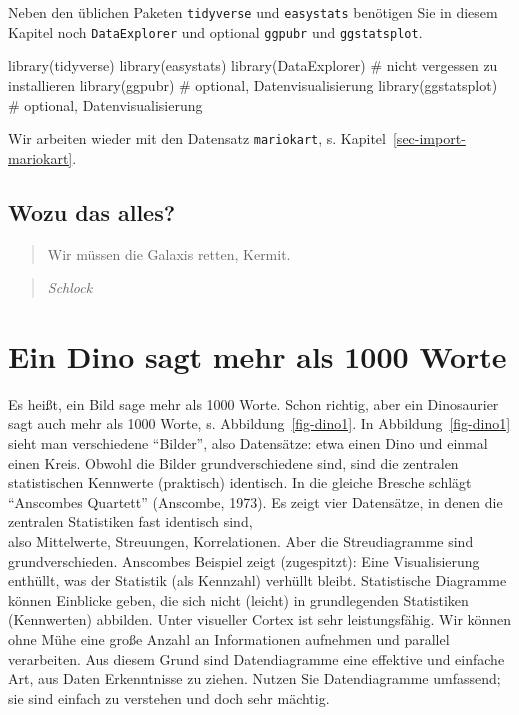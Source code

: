 \documentclass[
  letterpaper,
  oneside,
  open=any]{scrbook}
\newenvironment{Shaded}{\begin{snugshade}}{\end{snugshade}}
\newcommand{\CommentTok}[1]{\textcolor[rgb]{0.37,0.37,0.37}{#1}}
\newcommand{\FunctionTok}[1]{\textcolor[rgb]{0.28,0.35,0.67}{#1}}
\newcommand{\NormalTok}[1]{\textcolor[rgb]{0.00,0.23,0.31}{#1}}
\theoremstyle{definition}
\theoremstyle{definition}
\theoremstyle{definition}
\theoremstyle{remark}
\begin{document}
Neben den üblichen Paketen \texttt{tidyverse} und \texttt{easystats}
benötigen Sie in diesem Kapitel noch \texttt{DataExplorer} und optional
\texttt{ggpubr} und \texttt{ggstatsplot}.

\begin{Shaded}
\begin{Highlighting}[]
\FunctionTok{library}\NormalTok{(tidyverse)}
\FunctionTok{library}\NormalTok{(easystats)}
\FunctionTok{library}\NormalTok{(DataExplorer)  }\CommentTok{\# nicht vergessen zu installieren}
\FunctionTok{library}\NormalTok{(ggpubr)  }\CommentTok{\# optional, Datenvisualisierung}
\FunctionTok{library}\NormalTok{(ggstatsplot)  }\CommentTok{\# optional, Datenvisualisierung}
\end{Highlighting}
\end{Shaded}

Wir arbeiten wieder mit den Datensatz \texttt{mariokart}, s.
Kapitel~\ref{sec-import-mariokart}.

\subsection{Wozu das alles?}\label{wozu-das-alles}

\begin{quote}
{} Wir müssen die Galaxis retten, Kermit.
\end{quote}

\begin{quote}
{} \emph{Schlock}
\end{quote}

\section{Ein Dino sagt mehr als 1000
Worte}\label{ein-dino-sagt-mehr-als-1000-worte}

Es heißt, ein Bild sage mehr als 1000 Worte. Schon richtig, aber ein
Dinosaurier sagt auch mehr als 1000 Worte, s. Abbildung~\ref{fig-dino1}.
In Abbildung~\ref{fig-dino1} sieht man verschiedene \enquote{Bilder},
also Datensätze: etwa einen Dino und einmal einen Kreis. Obwohl die
Bilder grundverschiedene sind, sind die zentralen statistischen
Kennwerte (praktisch) identisch. In die gleiche Bresche schlägt
\enquote{Anscombes Quartett} (Anscombe, 1973). Es zeigt vier Datensätze,
in denen die zentralen Statistiken fast identisch sind,\\
also Mittelwerte, Streuungen, Korrelationen. Aber die Streudiagramme
sind grundverschieden. Anscombes Beispiel zeigt (zugespitzt): Eine
Visualisierung enthüllt, was der Statistik (als Kennzahl) verhüllt
bleibt. Statistische Diagramme können Einblicke geben, die sich nicht
(leicht) in grundlegenden Statistiken (Kennwerten) abbilden. Unter
visueller Cortex ist sehr leistungsfähig. Wir können ohne Mühe eine
große Anzahl an Informationen aufnehmen und parallel verarbeiten. Aus
diesem Grund sind Datendiagramme eine effektive und einfache Art, aus
Daten Erkenntnisse zu ziehen. Nutzen Sie Datendiagramme umfassend; sie
sind einfach zu verstehen und doch sehr mächtig.
\end{document}
